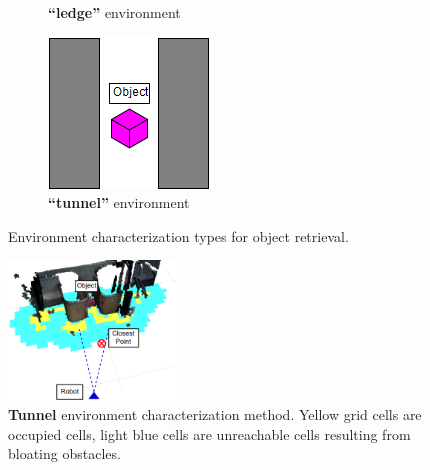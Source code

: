 \documentclass[conference]{IEEEtran}
\begin{document}
\begin{figure}[t]
\begin{subfigure}[t]{0.15\textwidth}
        \caption{\textbf{``ledge''} environment}
    \end{subfigure}
        \begin{subfigure}[t]{0.15\textwidth}
        \includegraphics[width=\textwidth]{images/tunnel.png}
        \caption{\textbf{``tunnel''} environment}
    \end{subfigure}
      \caption{Environment characterization types for object retrieval.}
      \label{fig:characters}
   \end{figure}
%
\begin{figure}
\begin{center}
\includegraphics[width=0.4\textwidth]{images/characterization.png}
\caption{\textbf{Tunnel} environment characterization method. Yellow grid cells are occupied cells, light blue cells are unreachable cells resulting from bloating obstacles.}
\label{fig:characterization}
\end{center}
\vspace{-2em}
\end{figure}
\end{document}
